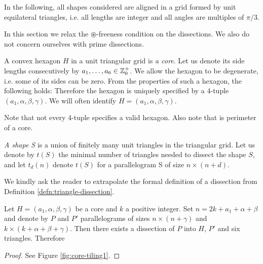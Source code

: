 In the following, all shapes considered are aligned in a grid formed by unit equilateral triangles, i.e. all lengths are integer and all angles are multiples of $\pi/3$.

In this section we relax the $\circledast$-freeness condition on the dissections.  We also do not concern ourselves with prime dissections.

\begin{defn}
A convex hexagon $H$ in a unit triangular grid is \emph{a core}. Let us denote its side lengths consecutively by $a_1,\dots,a_6 \in \mathbb Z_0^+$. We allow the hexagon to be degenerate, i.e. some of its sides can be zero. From the properties of such a hexagon, the following holds:
Therefore the hexagon is uniquely specified by a 4-tuple $(a_1, \alpha, \beta, \gamma)$. We will often identify $H = (a_1, \alpha, \beta, \gamma)$.
\end{defn}

Note that not every 4-tuple specifies a valid hexagon. Also note that
%
is perimeter of a core.

\begin{defn}
\emph{A shape S} is a union of finitely many unit triangles in the triangular grid. Let us denote by $t(S)$ the minimal number of triangles needed to dissect the shape $S$, and let $t_d(n)$ denote $t(S)$ for a parallelogram S of size $n \times (n+d)$.
\end{defn}

We kindly ask the reader to extrapolate the formal definition of a dissection from Definition \ref{defn:triangle-dissection}.

\begin{lem}
\label{lem:core-tiling}
Let $H = (a_1, \alpha, \beta, \gamma)$ be a core and $k$ a positive integer. Set $n = 2k+a_1+\alpha+\beta$ and denote by $P$ and $P'$ parallelograms of sizes $n\times(n+\gamma)$ and $k\times(k+\alpha+\beta+\gamma)$. Then there exists a dissection of $P$ into $H$, $P'$ and six triangles. Therefore
\end{lem}
\begin{proof}
See Figure \ref{fig:core-tiling1}.
\end{proof}

